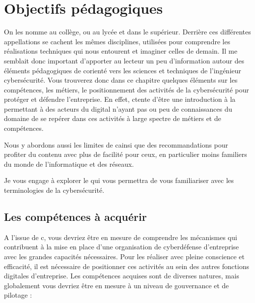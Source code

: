  
\section{Objectifs pédagogiques}

On les nomme  au collège,  ou  au lycée et dans le supérieur. Derrière ces différentes appellations se cachent les mêmes disciplines, utilisées pour comprendre les réalisations techniques qui nous entourent et imaginer celles de demain.
Il me semblait donc important d'apporter au lecteur un peu d'information autour des éléments pédagogiques de c\ecours  orienté vers les sciences et techniques de l'ingénieur cybersécurité. Vous trouverez donc dans ce chapitre quelques éléments sur les compétences, les métiers, le positionnement des activités de la cybersécurité pour protéger et défendre  l'entreprise.
En effet, c\ecours tente d'être une introduction à la \etitle permettant à des acteurs du digital n'ayant pas ou peu de connaissances du domaine de se repérer dans ces activités à large spectre de métiers et de compétences.


Nous y abordons aussi les limites de c\ecours ainsi que des recommandations pour profiter du contenu avec plus de facilité pour ceux, en particulier moins familiers du monde de l'informatique et des réseaux.

Je vous engage à explorer le   qui vous permettra de vous familiariser avec les terminologies de la cybersécurité.

\subsection{Les compétences à acquérir}
A l'issue de c\ecours, vous devriez être en mesure de comprendre les mécanismes qui contribuent à la mise en place d'une organisation de cyberdéfense d'entreprise avec les grandes capacités nécessaires. Pour les réaliser avec pleine conscience et efficacité, il est nécessaire de positionner ces activités au sein des autres fonctions digitales  d'entreprise. Les compétences acquises sont de diverses natures, mais globalement vous devriez être en mesure à un niveau de gouvernance et de pilotage  :  

